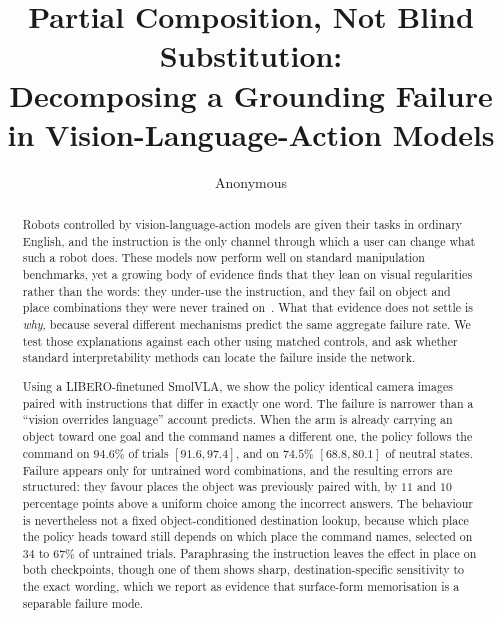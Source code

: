 \documentclass{article}
\title{Partial Composition, Not Blind Substitution:\\
Decomposing a Grounding Failure in Vision-Language-Action Models}
\author{%
  Anonymous \\
}
\begin{document}
\maketitle

\begin{abstract}
Robots controlled by vision-language-action models are given their tasks in ordinary English,
and the instruction is the only channel through which a user can change what such a robot does.
These models now perform well on standard manipulation benchmarks, yet a growing body of
evidence finds that they lean on visual regularities rather than the words: they under-use the
instruction, and they fail on object and place combinations they were never trained
on~\citep{brittle,scaleup}. What that evidence does not settle is \emph{why}, because several
different mechanisms predict the same aggregate failure rate. We test those explanations against
each other using matched controls, and ask whether standard interpretability methods can locate
the failure inside the network.

Using a LIBERO-finetuned SmolVLA, we show the policy identical camera images paired with
instructions that differ in exactly one word. The failure is narrower than a
``vision overrides language'' account predicts. When the arm is already carrying an object
toward one goal and the command names a different one, the policy follows the command on
$94.6\%$ of trials $[91.6, 97.4]$, and on $74.5\%$ $[68.8, 80.1]$ of neutral
states. Failure appears only for untrained word combinations, and the
resulting errors are structured: they favour places the object was previously paired with, by
$11$ and $10$ percentage points above a uniform choice among the incorrect answers. The
behaviour is nevertheless not a fixed object-conditioned destination lookup, because which
place the policy heads toward still depends on which place the command names, selected on
$34$ to $67\%$ of untrained trials. Paraphrasing the instruction leaves the effect in place on
both checkpoints, though one of them shows sharp, destination-specific sensitivity to the exact
wording, which we report as evidence that surface-form memorisation is a separable failure mode.


\end{abstract}
\end{document}
